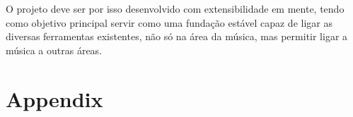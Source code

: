 \documentclass[
  oneside,
  11pt, a4paper,
  footinclude=true,
  headinclude=true,
  cleardoublepage=empty
]{scrbook}
\begin{document}
	O projeto deve ser por isso desenvolvido com extensibilidade em mente, tendo como objetivo principal servir como uma fundação estável capaz de ligar as diversas ferramentas existentes, não só na área da música, mas permitir ligar a música a outras áreas.
    

	

	
	
	
	\chapter{Appendix}
\end{document}
